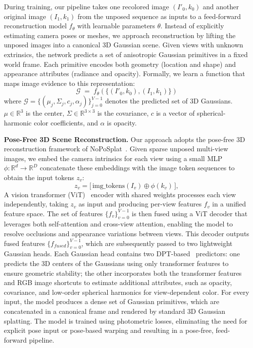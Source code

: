 During training, our pipeline takes one recolored image $(I'_0, k_0)$ and another original image $(I_1, k_1)$ from the unposed sequence as inputs to a feed-forward reconstruction model $f_{\theta}$ with learnable parameters $\theta$.
%
Instead of explicitly estimating camera poses or meshes, we approach reconstruction by lifting the unposed images into a canonical 3D Gaussian scene. Given views with unknown extrinsics, the network predicts a set of anisotropic Gaussian primitives in a fixed world frame. Each primitive encodes both geometry (location and shape) and appearance attributes (radiance and opacity).
%
Formally, we learn a function that maps image evidence to this representation:
\begin{equation*}
\mathcal{G} \;=\; f_{\theta}\!\left(\{(I'_0, k_0),(I_1, k_1)\}\right)
\end{equation*}
where $\mathcal{G}=\{(\mu_j,\Sigma_j,c_j,\alpha_j)\}_{j=0}^{V-1}$ denotes the predicted set of 3D Gaussians. $\mu\!\in\!\mathbb{R}^3$ is the center, $\Sigma\!\in\!\mathbb{R}^{3\times3}$ is the covariance, 
$c$ is a vector of spherical-harmonic color coefficients, and $\alpha$ is opacity.

\vspace{1mm}
\noindent\textbf{Pose-Free 3D Scene Reconstruction.}
Our approach adopts the pose-free 3D reconstruction framework of NoPoSplat~\cite{noposplat}. Given sparse unposed multi-view images, we embed the camera intrinsics for each view using a small MLP $\phi:\mathbb{R}^d \to \mathbb{R}^D$ concatenate these embeddings with the image token sequences to obtain the input tokens $z_v$:
\begin{equation*}
    z_v = \big[\,\text{img\_tokens}(I_v) \oplus \phi(k_v)\,\big],
\end{equation*}
A vision transformer (ViT)~\cite{vit} encoder with shared weights processes each view independently, taking $z_v$ as input and producing per-view features $f_v$ in a unified feature space. The set of features $\{f_v\}_{v=0}^{V-1}$ is then fused using a ViT decoder that leverages both self-attention and cross-view attention, enabling the model to resolve occlusions and appearance variations between views. This decoder outputs fused features $\{f_{fused}\}_{v=0}^{V-1}$, which are subsequently passed to two lightweight Gaussian heads.
%
Each Gaussian head contains two DPT-based~\cite{dust3r} predictors: one predicts the 3D centers of the Gaussians using only transformer features to ensure geometric stability; the other incorporates both the transformer features and RGB image shortcuts to estimate additional attributes, such as opacity, covariance, and low-order spherical harmonics for view-dependent color. For every input, the model produces a dense set of Gaussian primitives, which are concatenated in a canonical frame and rendered by standard 3D Gaussian splatting. The model is trained using photometric losses, eliminating the need for explicit pose input or pose-based warping and resulting in a pose-free, feed-forward pipeline.

